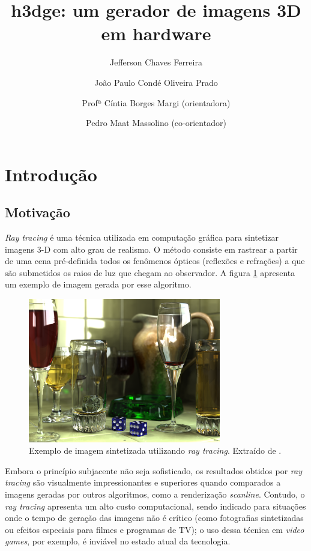 \documentclass[a4paper,12pt]{article}
\title{h3dge: um gerador de imagens 3D em hardware}
\author{Jefferson Chaves Ferreira \\
  \and João Paulo Condé Oliveira Prado \\
  \and Profª Cíntia Borges Margi (orientadora) \\
  \and Pedro Maat Massolino (co-orientador)}
\newcommand\raytracing{\emph{ray tracing}}
\newcommand\Raytracing{\emph{Ray tracing}}
\begin{document}
\maketitle

\section{Introdução}
\subsection{Motivação}
\Raytracing{} é uma técnica utilizada em computação gráfica para sintetizar
imagens 3-D com alto grau de realismo. O método consiste em rastrear a partir de
uma cena pré-definida todos os fenômenos ópticos (reflexões e refrações) a
que são submetidos os raios de luz que chegam ao observador. A figura
\ref{fig:raytraced_glasses} apresenta um exemplo de imagem gerada por esse
algoritmo.

\begin{figure}[htb]
  \centering
  \includegraphics[width=0.75\textwidth]{figures/raytraced_glasses}
  \caption{Exemplo de imagem sintetizada utilizando \raytracing{}. Extraído
    de \cite{wiki:ray_tracing}.}
  \label{fig:raytraced_glasses}
\end{figure}

Embora o princípio subjacente não seja sofisticado, os resultados obtidos por
\raytracing{} são visualmente impressionantes e superiores quando
comparados a imagens geradas por outros algoritmos, como a renderização
\emph{scanline}. Contudo, o \raytracing{} apresenta um alto custo
computacional, sendo indicado para situações onde o tempo de geração das
imagens não é crítico (como fotografias sintetizadas ou efeitos especiais
para filmes e programas de TV); o uso dessa técnica em \emph{video games},
por exemplo, é inviável no estado atual da tecnologia.
\end{document}
